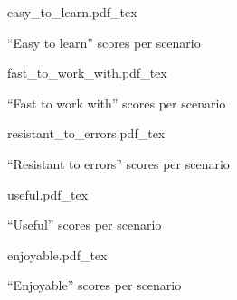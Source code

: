 \begin{figure}
    \centering
    \def\svgwidth{\columnwidth}
    {easy_to_learn.pdf_tex}
    \caption{``Easy to learn'' scores per scenario}
    \label{fig:preliminary_study_easy_to_learn}
\end{figure}

\begin{figure}
    \centering
    \def\svgwidth{\columnwidth}
    {fast_to_work_with.pdf_tex}
    \caption{``Fast to work with'' scores per scenario}
    \label{fig:preliminary_study_fast_to_work_with}
\end{figure}

\begin{figure}
    \centering
    \def\svgwidth{\columnwidth}
    {resistant_to_errors.pdf_tex}
    \caption{``Resistant to errors'' scores per scenario}
    \label{fig:preliminary_study_resistant_to_errors}
\end{figure}

\begin{figure}
    \centering
    \def\svgwidth{\columnwidth}
    {useful.pdf_tex}
    \caption{``Useful'' scores per scenario}
    \label{fig:preliminary_study_useful}
\end{figure}

\begin{figure}
    \centering
    \def\svgwidth{\columnwidth}
    {enjoyable.pdf_tex}
    \caption{``Enjoyable'' scores per scenario}
    \label{fig:preliminary_study_enjoyable}
\end{figure}
